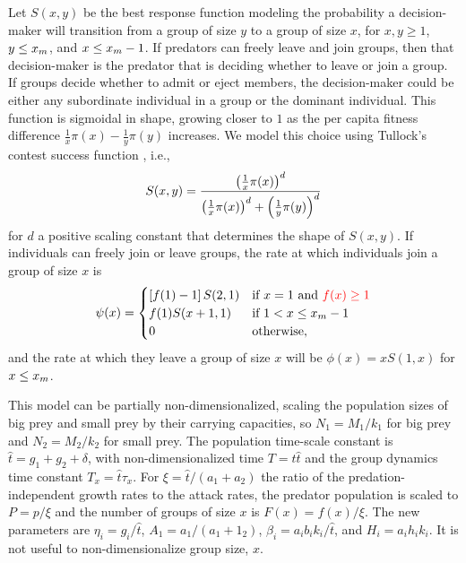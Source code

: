 Let $S(x,y)$ be the best response function modeling the probability a decision-maker will transition from a group of size $y$ to a group of size $x$, for $x,y \geq 1$, $y \leq x_{m}$, and $x \leq x_{m} - 1$. If predators can freely leave and join groups, then that decision-maker is the predator that is deciding whether to leave or join a group. If groups decide whether to admit or eject members, the decision-maker could be either any subordinate individual in a group or the dominant individual. This function is sigmoidal in shape, growing closer to $1$ as the per capita fitness difference $\frac{1}{x} \pi(x) - \frac{1}{y}\pi(y)$ increases. We model this choice using Tullock's contest success function \cite{tullock_efficient_1980}, i.e.,
\begin{equation} \label{best_response_function}
S(x,y) = \frac{\left( \frac{1}{x}\pi(x) \right)^d}{\left( \frac{1}{x} \pi(x) \right)^d + \left( \frac{1}{y}\pi(y) \right)^d}
\end{equation}
for $d$ a positive scaling constant that determines the shape of $S(x,y)$. If individuals can freely join or leave groups, the rate at which individuals join a group of size $x$ is
\begin{equation}
\psi(x) = 
\begin{cases}
\left[ f(1) - 1 \right] S(2,1) & \text{if } x = 1 \text{ and } \textcolor{red}{f(x) \geq 1}\\
f(1) S(x+1,1)  & \text{if } 1 < x \leq x_{m} - 1 \\
0 & \text{otherwise},
\end{cases}
\end{equation}
and the rate at which they leave a group of size $x$ will be $\phi(x) = xS(1,x)$ for $x \leq x_{m}$.  

This model can be partially non-dimensionalized, scaling the population sizes of big prey and small prey by their carrying capacities, so $N_1 = M_1/k_1$ for big prey and $N_2 = M_2/k_2$ for small prey. The population time-scale constant is $\hat{t} = g_1 + g_2 + \delta$, with non-dimensionalized time $T = t \hat{t}$ and the group dynamics time constant $T_x = \hat{t} \tau_x$. For $\xi = \hat{t}/(a_1 + a_2)$ the ratio of the predation-independent growth rates to the attack rates, the predator population is scaled to $P = p/\xi$ and the number of groups of size $x$ is $F(x) = f(x) /\xi$. The new parameters are $\eta_i = g_i/\hat{t}$, $A_1 = a_1/(a_1 + 1_2)$, $\beta_i = a_i b_i k_i/\hat{t}$, and $H_i = a_i h_i k_i$. It is not useful to non-dimensionalize group size, $x$.


